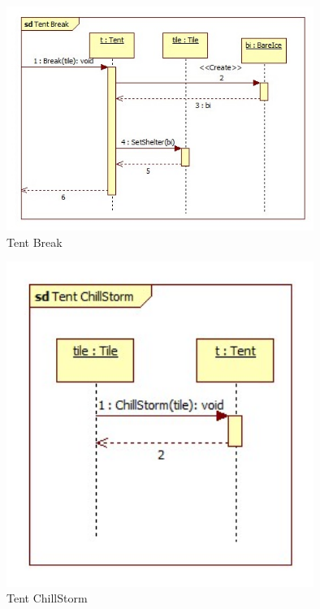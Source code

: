 \begin{figure}[H]
        \begin{center}
                \includegraphics[width=10cm]{chapters/chapter07/seqdiag/Tent_Break.jpg}
                \caption{Tent Break}
                \label{Tent Break}
        \end{center}
\end{figure}
\begin{figure}[H]
        \begin{center}
                \includegraphics[width=10cm]{chapters/chapter07/seqdiag/Tent_ChillStorm.jpg}
                \caption{Tent ChillStorm}
                \label{Tent ChillStorm}
        \end{center}
\end{figure}
